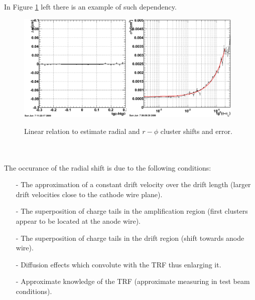 \documentclass{alicetdr}
\begin{document}
In Figure \ref{FIG_CLUSTER:shift} left there is an example of such dependency. 
\begin{figure}[htb]
\begin{center}
\includegraphics[width=0.48\textwidth]{plots/clusterShiftMethod.eps}
\includegraphics[width=0.48\textwidth]{plots/clusterSigmaMethod.eps}
\end{center}
\caption{
Linear relation to estimate radial and $r-\phi$ cluster shifts and error.}
\label{FIG_CLUSTER:shift}
\end{figure}
\\
\\
The occurance of the radial shift is due to the following conditions:
\begin{itemize}
  \item[-] The approximation of a constant drift velocity over the drift length 
           (larger drift velocities close to the cathode wire plane).
  \item[-] The superposition of charge tails in the amplification region (first 
           clusters appear to be located at the anode wire).
  \item[-] The superposition of charge tails in the drift region (shift towards 
           anode wire).
  \item[-] Diffusion effects which convolute with the TRF thus enlarging it.
  \item[-] Approximate knowledge of the TRF (approximate measuring in test beam 
           conditions).
\end{itemize}
\end{document}
